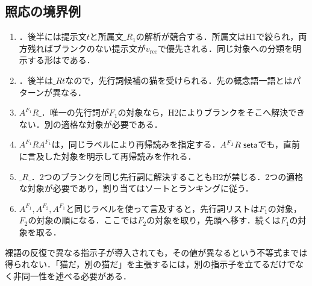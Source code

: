 \documentclass[../../main-detail.tex]{subfiles}
\begin{document}
\subsection{照応の境界例}\label{subsec:practice-anaphora-cases}
\begin{enumerate}
 \item {}．後半には提示文$t$と所属文$\_R_1$の解析が競合する．所属文はH1で絞られ，両方残ればブランクのない提示文が$v_{\mathrm{rec}}$で優先される．同じ対象への分類を明示する形はである．
 \item {}．後半は$\_Rt$なので，先行詞候補の猫を受けられる．先の概念語一語とはパターンが異なる．
 \item $A^{F_1}R\_$．唯一の先行詞が$F_1$の対象なら，H2によりブランクをそこへ解決できない．別の適格な対象が必要である．
 \item $A^{F_1}RA^{F_1}$は，同じラベルにより再帰読みを指定する．$A^{F_1}R\;\textsf{seta}$でも，直前に言及した対象を明示して再帰読みを作れる．
 \item $\_R\_$．2つのブランクを同じ先行詞に解決することもH2が禁じる．2つの適格な対象が必要であり，割り当てはソートとランキングに従う．
 \item $A^{F_1},A^{F_2},A^{F_1}$と同じラベルを使って言及すると，先行詞リストは$F_1$の対象，$F_2$の対象の順になる．ここでは$F_2$の対象を取り，先頭へ移す．続くは$F_1$の対象を取る．
\end{enumerate}
\begin{remark}[新規指示子と非同一性]
裸語の反復で異なる指示子が導入されても，その値が異なるという不等式までは得られない．「猫だ，別の猫だ」を主張するには，別の指示子を立てるだけでなく非同一性を述べる必要がある．
\end{remark}
\end{document}
